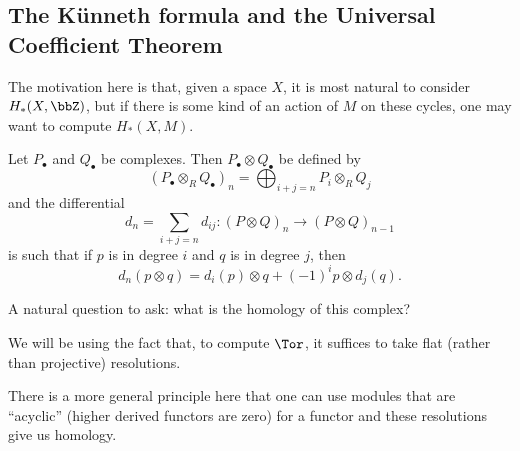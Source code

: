 \documentclass[12pt]{article}
\begin{document}
\subsection{The K\"unneth formula and the Universal Coefficient Theorem}
The motivation here is that, given a space $X$, it is most natural to consider $H_\ast(X,\bbZ)$, 
but if there is some kind of an action of $M$ on these cycles, one may want to compute $H_\ast(X,M)$.

\begin{defn}
	Let $P_\bullet$ and $Q_\bullet$ be complexes. Then $P_\bullet\otimes Q_\bullet$ be defined by 
	\[(P_\bullet\otimes_RQ_\bullet)_n=\bigoplus_{i+j=n}P_i\otimes_R Q_j\]
	and the differential 
	\[d_n=\sum_{i+j=n}d_{ij}:(P\otimes Q)_n\to (P\otimes Q)_{n-1}\]
	is such that if $p$ is in degree $i$ and $q$ is in degree $j$, then 
	\[d_n(p\otimes q)=d_i(p)\otimes q+(-1)^ip\otimes d_j(q).\]
\end{defn}

A natural question to ask: what is the homology of this complex?
\begin{rmk}
	We will be using the fact that, to compute $\Tor$, it suffices to take flat (rather than projective)
	resolutions. 

	There is a more general principle here that one can use modules that are ``acyclic'' (higher derived functors are zero)
	for a functor and these resolutions give us homology.
\end{rmk}
\end{document}
